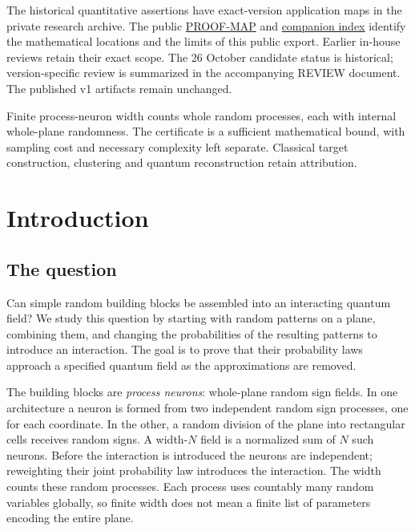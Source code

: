 \documentclass[11pt]{article}
\theoremstyle{plain}
\theoremstyle{definition}
\theoremstyle{remark}
\begin{document}
The historical quantitative assertions have exact-version application maps
in the private research archive. The public
\href{run:PROOF-MAP.md}{PROOF-MAP} and
\href{run:COMPANION-INDEX.md}{companion index} identify the mathematical
locations and the limits of this public export. Earlier in-house reviews
retain their exact scope. The 26 October candidate status is historical;
version-specific review is summarized in the accompanying REVIEW document.
The published v1 artifacts remain unchanged.

Finite process-neuron width counts whole random processes, each with internal
whole-plane randomness. The certificate is a sufficient mathematical bound,
with sampling cost and necessary complexity left separate. Classical target
construction, clustering and quantum reconstruction retain attribution.

\clearpage
\tableofcontents
\clearpage

\section{Introduction}\label{sec:intro}

\subsection{The question}\label{sec:intro-question}

Can simple random building blocks be assembled into an interacting quantum
field? We study this question by starting with random patterns on a plane,
combining them, and changing the probabilities of the resulting patterns to
introduce an interaction. The goal is to prove that their probability laws
approach a specified quantum field as the approximations are removed.

The building blocks are \emph{process neurons}: whole-plane random sign fields.
In one architecture a neuron is formed from two independent random sign
processes, one for each coordinate. In the other, a random division of the
plane into rectangular cells receives random signs. A width-$N$ field is a
normalized sum of $N$ such neurons. Before the interaction is introduced the
neurons are independent; reweighting their joint probability law introduces
the interaction. The width counts these random processes. Each process uses
countably many random variables globally, so finite width does not mean a
finite list of parameters encoding the entire plane.
\end{document}
